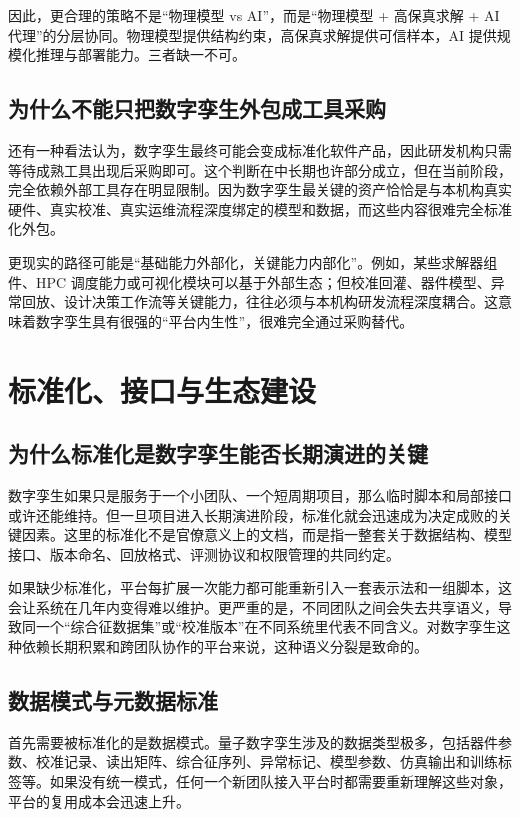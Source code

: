\documentclass[11pt,a4paper]{article}
\begin{document}
因此，更合理的策略不是“物理模型 vs AI”，而是“物理模型 + 高保真求解 + AI 代理”的分层协同。物理模型提供结构约束，高保真求解提供可信样本，AI 提供规模化推理与部署能力。三者缺一不可。

\subsection{为什么不能只把数字孪生外包成工具采购}

还有一种看法认为，数字孪生最终可能会变成标准化软件产品，因此研发机构只需等待成熟工具出现后采购即可。这个判断在中长期也许部分成立，但在当前阶段，完全依赖外部工具存在明显限制。因为数字孪生最关键的资产恰恰是与本机构真实硬件、真实校准、真实运维流程深度绑定的模型和数据，而这些内容很难完全标准化外包。

更现实的路径可能是“基础能力外部化，关键能力内部化”。例如，某些求解器组件、HPC 调度能力或可视化模块可以基于外部生态；但校准回灌、器件模型、异常回放、设计决策工作流等关键能力，往往必须与本机构研发流程深度耦合。这意味着数字孪生具有很强的“平台内生性”，很难完全通过采购替代。

\section{标准化、接口与生态建设}

\subsection{为什么标准化是数字孪生能否长期演进的关键}

数字孪生如果只是服务于一个小团队、一个短周期项目，那么临时脚本和局部接口或许还能维持。但一旦项目进入长期演进阶段，标准化就会迅速成为决定成败的关键因素。这里的标准化不是官僚意义上的文档，而是指一整套关于数据结构、模型接口、版本命名、回放格式、评测协议和权限管理的共同约定。

如果缺少标准化，平台每扩展一次能力都可能重新引入一套表示法和一组脚本，这会让系统在几年内变得难以维护。更严重的是，不同团队之间会失去共享语义，导致同一个“综合征数据集”或“校准版本”在不同系统里代表不同含义。对数字孪生这种依赖长期积累和跨团队协作的平台来说，这种语义分裂是致命的。

\subsection{数据模式与元数据标准}

首先需要被标准化的是数据模式。量子数字孪生涉及的数据类型极多，包括器件参数、校准记录、读出矩阵、综合征序列、异常标记、模型参数、仿真输出和训练标签等。如果没有统一模式，任何一个新团队接入平台时都需要重新理解这些对象，平台的复用成本会迅速上升。
\end{document}
